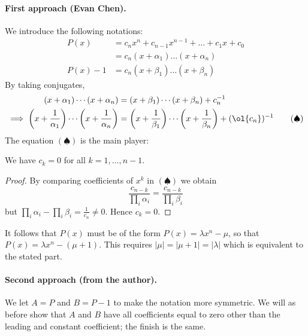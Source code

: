 \documentclass[11pt]{scrartcl}
\begin{document}
\paragraph{First approach (Evan Chen).}
We introduce the following notations:
\begin{align*}
  P(x) &= c_n x^n + c_{n-1}x^{n-1} + \dots + c_1 x + c_0 \\
    &= c_n (x+\alpha_1) \dots (x+\alpha_n) \\
  P(x)-1 &= c_n (x+\beta_1) \dots (x+\beta_n)
\end{align*}
By taking conjugates,
\begin{align*}
  (x + \alpha_1) \dotsm (x + \alpha_n) &= (x + \beta_1) \dotsm (x + \beta_n) + c_n^{-1} \\
  \implies \left(x + \frac{1}{\alpha_1}\right) \dotsm \left(x + \frac{1}{\alpha_n}\right)
  & = \left(x + \frac{1}{\beta_1}\right) \dotsm \left(x + \frac{1}{\beta_n}\right)
    + (\ol{c_n})^{-1} \qquad (\spadesuit)
\end{align*}
The equation $(\spadesuit)$ is the main player:
\begin{claim*}
  We have $c_k = 0$ for all $k = 1, \dots, n-1$.
\end{claim*}
\begin{proof}
  By comparing coefficients of $x^k$ in $(\spadesuit)$
  we obtain
  \[ \frac{c_{n-k}}{\prod_i \alpha_i} = \frac{c_{n-k}}{\prod_i \beta_i} \]
  but $\prod_i \alpha_i - \prod_i \beta_i = \frac{1}{c_n} \neq 0$.
  Hence $c_k = 0$.
\end{proof}

It follows that $P(x)$
must be of the form $P(x) = \lambda x^n - \mu$,
so that $P(x) = \lambda x^n - (\mu + 1)$.
This requires $|\mu| = |\mu+1| = |\lambda|$
which is equivalent to the stated part.

\paragraph{Second approach (from the author).}
We let $A = P$ and $B = P-1$ to make the notation more symmetric.
We will as before show that $A$ and $B$ have all coefficients equal to zero
other than the leading and constant coefficient; the finish is the same.
\end{document}
